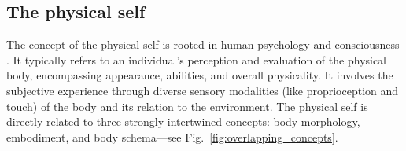 \subsection{The physical self}
%
%
The concept of the physical self is rooted in human psychology and consciousness \cite{Tsakiris2016multisensorybasisself,Overgaard2023selfitsbody}. It typically refers to an individual's perception and evaluation of the physical body, encompassing appearance, abilities, and overall physicality. It involves the subjective experience through diverse sensory modalities (like proprioception and touch) of the body and its relation to the environment. The physical self is directly related to three strongly intertwined concepts: body morphology, embodiment, and body schema---see Fig.~\ref{fig:overlapping_concepts}.

